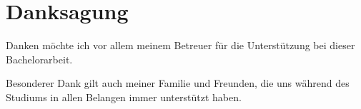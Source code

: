 \chapter*{Danksagung}
\thispagestyle{plain}
\pagestyle{plain}

Danken möchte ich vor allem meinem Betreuer für die Unterstützung bei dieser Bachelorarbeit. 

Besonderer Dank gilt auch meiner Familie und Freunden, die uns während des Studiums in allen Belangen immer unterstützt haben. 

































